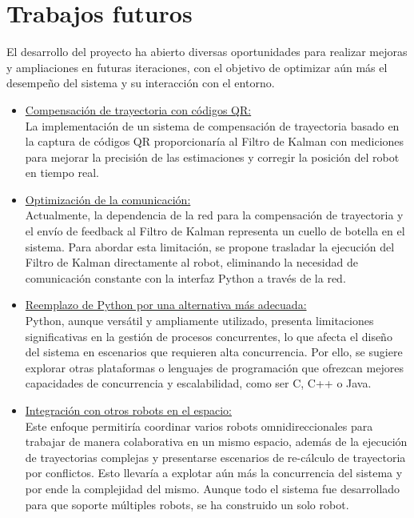 \newpage
\chapter{Trabajos futuros}

El desarrollo del proyecto ha abierto diversas oportunidades para realizar mejoras y ampliaciones en futuras iteraciones, con el objetivo de optimizar aún más el desempeño del sistema y su interacción con el entorno.

\begin{itemize}
    \item \underline{Compensación de trayectoria con códigos QR:} \\
    La implementación de un sistema de compensación de trayectoria basado en la captura de códigos QR proporcionaría al Filtro de Kalman con mediciones para mejorar la precisión de las estimaciones y corregir la posición del robot en tiempo real. \\

    \item \underline{Optimización de la comunicación:} \\
    Actualmente, la dependencia de la red para la compensación de trayectoria y el envío de feedback al Filtro de Kalman representa un cuello de botella en el sistema. Para abordar esta limitación, se propone trasladar la ejecución del Filtro de Kalman directamente al robot, eliminando la necesidad de comunicación constante con la interfaz Python a través de la red. \\

    \item \underline{Reemplazo de Python por una alternativa más adecuada:} \\
    Python, aunque versátil y ampliamente utilizado, presenta limitaciones significativas en la gestión de procesos concurrentes, lo que afecta el diseño del sistema en escenarios que requieren alta concurrencia. Por ello, se sugiere explorar otras plataformas o lenguajes de programación que ofrezcan mejores capacidades de concurrencia y escalabilidad, como ser C, C++ o Java. \\

    \item \underline{Integración con otros robots en el espacio:} \\
    Este enfoque permitiría coordinar varios robots omnidireccionales para trabajar de manera colaborativa en un mismo espacio, además de la ejecución de trayectorias complejas y presentarse escenarios de re-cálculo de trayectoria por conflictos. Esto llevaría a explotar aún más la concurrencia del sistema y por ende la complejidad del mismo. Aunque todo el sistema fue desarrollado para que soporte múltiples robots, se ha construido un solo robot. 
\end{itemize}
